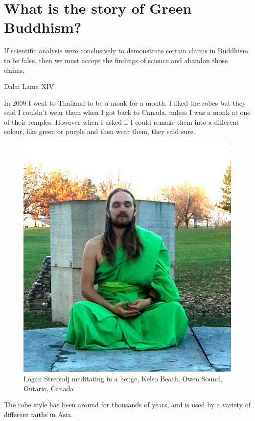 
\chapter{What is the story of Green Buddhism?}
\epigraph{If scientific analysis were conclusively to demonstrate certain claims
in Buddhism to be false, then we must accept the findings of science and abandon
those claims.}
{Dalai Lama XIV\cite{singleAtom}}
\label{whatstory}
In 2009 I went to Thailand to be a monk for a month. I liked the robes but they
said I couldn't wear them when I got back to Canada, unless I was a monk at one
of their temples. However when I asked if I could remake them into a different 
colour, like green or purple and then wear them, they said sure. 

\begin{figure}
  \includegraphics{photograph/logan_streondj_meditating_20151109.png}
  \caption{Logan Streondj meditating in a henge, Kelso Beach, 
          Owen Sound, Ontario, Canada}
\label{fig:meditating}
\end{figure}

The robe style has been around for thousands of years, and is used by a variety
of different faiths in Asia. 

